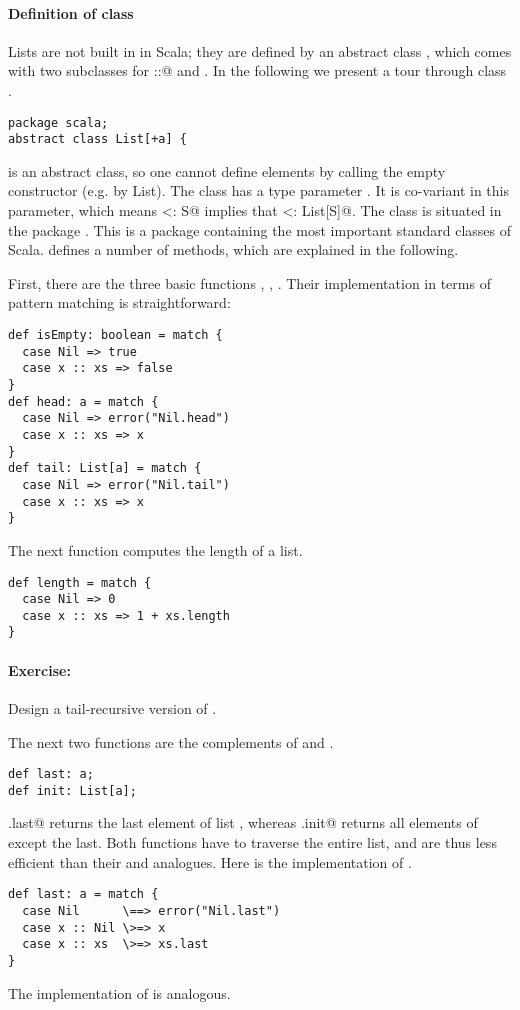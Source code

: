 \documentclass[11pt]{book}
\newcommand{\exercise}{\paragraph{Exercise:}}
\begin{document}
\paragraph{Definition of class \verb@List@}

Lists are not built in in Scala; they are defined by an abstract class
\verb@List@, which comes with two subclasses for \verb@::@ and \verb@Nil@.
In the following we present a tour through class \verb@List@.
\begin{verbatim}
package scala;
abstract class List[+a] {
\end{verbatim}
\verb@List@ is an abstract class, so one cannot define elements by
calling the empty \verb@List@ constructor (e.g. by
\verb@new List).  The class has a type parameter \verb@a@. It is
co-variant in this parameter, which means \verb@T <: S@ implies that
\verb@List[T] <: List[S]@.  The class is situated in the package
\verb@scala@. This is a package containing the most important standard
classes of Scala. \verb@List@ defines a number of methods, which are
explained in the following.

First, there are the three basic functions \verb@isEmpty@, 
\verb@head@, \verb@tail@. Their implementation in terms of pattern
matching is straightforward:
\begin{verbatim}
def isEmpty: boolean = match {
  case Nil => true
  case x :: xs => false 
}   
def head: a = match { 
  case Nil => error("Nil.head") 
  case x :: xs => x 
}
def tail: List[a] = match { 
  case Nil => error("Nil.tail") 
  case x :: xs => x 
}
\end{verbatim}

The next function computes the length of a list.
\begin{verbatim}
def length = match {
  case Nil => 0
  case x :: xs => 1 + xs.length
}
\end{verbatim}

\exercise Design a tail-recursive version of \verb@length@.

The next two functions are the complements of \verb@head@ and
\verb@tail@.
\begin{verbatim}
def last: a;
def init: List[a];
\end{verbatim}
\verb@xs.last@ returns the last element of list \verb@xs@, whereas
\verb@xs.init@ returns all elements of \verb@xs@ except the last.
Both functions have to traverse the entire list, and are thus less
efficient than their \verb@head@ and \verb@tail@ analogues.
Here is the implementation of \verb@last@.
\begin{verbatim}
def last: a = match {
  case Nil      \==> error("Nil.last")
  case x :: Nil \>=> x
  case x :: xs  \>=> xs.last
}
\end{verbatim}
The implementation of \verb@init@ is analogous.
\end{document}
